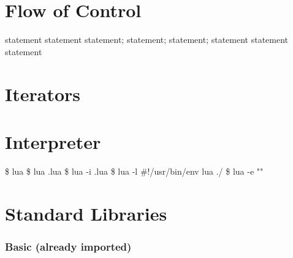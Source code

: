 \documentclass{refcard}
\begin{document}
\section{Flow of Control}

\begin{ldesc}
	  statement \li
	                                    statement
	  statement; \li
	                                      statement;
	  statement; statement
	 statement statement
\end{ldesc}


\section{Iterators}




\section{Interpreter}

\begin{ldesc}
	   \$ lua
	           \$ lua .lua
	 \$ lua -i .lua
	 \$ lua -l
	        \#!/usr/bin/env lua
	 ./
	 \$ lua -e ""
\end{ldesc}


\pagebreak
\section{Standard Libraries}

\subsubsection{Basic (already imported)}
\end{document}
